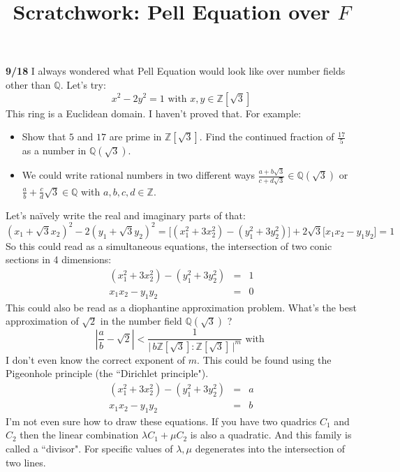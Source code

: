 \documentclass[12pt]{article}
\title{Scratchwork: Pell Equation over $F$}
\date{}
\begin{document}
\sffamily

\maketitle

\noindent \textbf{9/18} I always wondered what Pell Equation would look like over number fields other than $\mathbb{Q}$.  Let's try:
$$ x^2 - 2 y^2 = 1 \text{ with } x,y \in \mathbb{Z}[\sqrt{3}] $$
This ring is a Euclidean domain.  I haven't proved that.  For example:
\begin{itemize}
\item Show that $5$ and $17$ are prime in $\mathbb{Z}[\sqrt{3}]$.  Find the continued fraction of $\frac{17}{5}$ as a number in $\mathbb{Q}(\sqrt{3})$.
\item We could write rational numbers in two different ways $ \frac{a + b \sqrt{3}}{c + d \sqrt{3}} \in \mathbb{Q}(\sqrt{3}) $ or $\frac{a}{b} + \frac{c}{d} \sqrt{3} \in \mathbb{Q}$ with $a,b,c,d \in \mathbb{Z}$.
\end{itemize}
Let's na\"{i}vely write the real and imaginary parts of that:
$$ (x_1 + \sqrt{3}x_2)^2 - 2 (y_1 + \sqrt{3}y_2)^2
= \big[(x_1^2 + 3x_2^2) - (y_1^2 + 3y_2^2)\big] 
+ 2\sqrt{3} \big[ x_1 x_2 -  y_1 y_2 \big] = 1$$
So this could read as a simultaneous equations, the intersection of two conic sections in 4 dimensions:
\begin{eqnarray*}
(x_1^2 + 3x_2^2) - (y_1^2 + 3y_2^2) &=& 1 \\ 
 x_1 x_2 -  y_1 y_2  &=& 0
\end{eqnarray*}
This could also be read as a diophantine approximation problem.  What's the best approximation of $\sqrt{2}$ in the number field $\mathbb{Q}(\sqrt{3})$ ?
$$ \left| \frac{a}{b} - \sqrt{2} \right| < \frac{1}{ \big|\, b \mathbb{Z}[\sqrt{3}]:\mathbb{Z}[\sqrt{3}] \, \big|^m} \text{ with }  $$
I don't even know the correct exponent of $m$.  This could be found using the Pigeonhole principle (the ``Dirichlet principle").  
\begin{eqnarray*}
(x_1^2 + 3x_2^2) - (y_1^2 + 3y_2^2) &=& a \\ 
 x_1 x_2 -  y_1 y_2  &=& b
\end{eqnarray*}
I'm not even sure how to draw these equations.  If you have two quadrics $C_1$ and $C_2$ then the linear combination $\lambda C_1 + \mu C_2$ is also a quadratic.  And this family is called a ``divisor".  For specific values of $\lambda, \mu$ degenerates into the intersection of two lines. \\ \\
\end{document}
